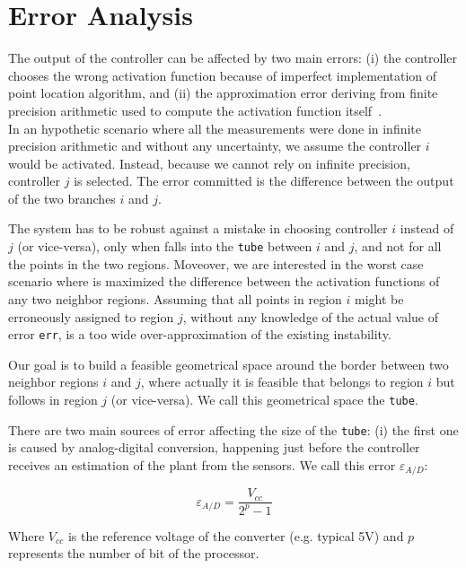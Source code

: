 \section{Error Analysis}
The output of the controller can be affected by two main errors: (i) the controller chooses the wrong activation function because of imperfect implementation of point location algorithm, and (ii) the approximation error deriving from finite precision arithmetic used to compute the activation function itself~\cite{imperialrmpc}.\\
In an hypothetic scenario where all the measurements were done in infinite precision arithmetic and without any uncertainty, we assume the controller $i$ would be activated. Instead, because we cannot rely on infinite precision, controller $j$ is selected. The error committed is the difference between the output of the two branches $i$ and $j$.

The system has to be robust against a mistake in choosing controller $i$ instead of $j$ (or vice-versa), only when \qstatevarmath falls into the \texttt{tube} between $i$ and $j$, and not for all the points in the two regions. Moveover, we are interested in the worst case scenario where is maximized the difference between the activation functions of any two neighbor regions. Assuming that all points in region $i$ might be erroneously assigned to region $j$, without any  knowledge of the actual value of error \texttt{err}, is a too wide over-approximation of the existing instability. 

Our goal is to build a feasible geometrical space around the border between two neighbor regions $i$ and $j$, where actually it is feasible that \statevarmath belongs to region $i$ but \qstatevarmath follows in region $j$ (or vice-versa).
We call this geometrical space the \texttt{tube}.

There are two main sources of error affecting the size of the \texttt{tube}: (i) the first one is caused by analog-digital conversion, happening just before the controller receives an estimation of the plant from the sensors. We call this error $\varepsilon_{A/D}$: 

\begin{equation}\nonumber
\varepsilon_{A/D}=\frac{V_{cc}}{2^{p}-1}
\end{equation}

Where $V_{cc}$ is the reference voltage of the converter (e.g. typical 5V) and $p$ represents the number of bit of the processor.

